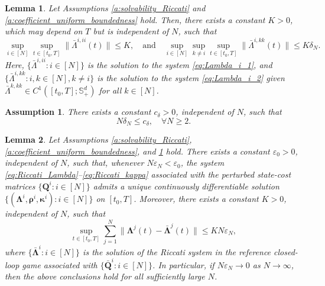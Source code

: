 \documentclass[10pt,a4paper]{amsart}
\newtheorem{assumption}{Assumption}
\newtheorem{lemma}{Lemma}
\begin{document}
\begin{lemma}
\label{l:estimate_bar_Lambda}
Let Assumptions \ref{a:solvability_Riccati} and \ref{a:coefficient_uniform_boundedness} hold. Then, there exists a constant $K > 0$, which may depend on $T$ but is independent of $N$, such that
$$\sup_{i \in [N]} \sup_{t \in [t_0, T]} \|\bar{\Lambda}^{i,ii}(t)\| \leq K, \quad \text{and} \quad \sup_{i \in [N]} \sup_{k \neq i} \sup_{t \in [t_0, T]} \|\bar{\Lambda}^{i,kk}(t)\| \leq K \delta_N.$$
Here, $\{\bar{\Lambda}^{i,ii}: i\in [N]\}$ is the solution to the system \eqref{eq:Lambda_i_1}, and $\{\bar{\Lambda}^{i,kk}: i, k \in [N], k \neq i\}$ is the solution to the system \eqref{eq:Lambda_i_2} given $\bar{\Lambda}^{k,kk} \in C^1([t_0,T]; \mathbb{S}^d_{+})$ for all $k \in [N]$.

\end{lemma}

\begin{assumption}
\label{a:delta_N_bound}
There exists a constant $c_{\delta} > 0$, independent of $N$, such that
$$N \delta_N \leq c_{\delta}, \quad \forall N \geq 2.$$
\end{assumption}

\begin{lemma}
\label{l:solvability_Riccati_Lambda_general}
Let Assumptions
\ref{a:solvability_Riccati},
\ref{a:coefficient_uniform_boundedness}, and
\ref{a:delta_N_bound} hold. There exists a constant $\varepsilon_0 > 0$, independent of $N$, such that, whenever $N \varepsilon_N < \varepsilon_0$, the system \eqref{eq:Riccati_Lambda}--\eqref{eq:Riccati_kappa} associated with the perturbed state-cost matrices $\{\bm{Q}^i:i\in[N]\}$ admits a unique continuously differentiable solution $\{(\bm{\Lambda}^i, \bm{\rho}^i, \bm{\kappa}^i): i \in [N]\}$ on $[t_0, T]$. Moreover, there exists a constant $K > 0$, independent of $N$, such that
$$\sup_{t \in [t_0, T]} \sum_{j=1}^N \|\bm{\Lambda}^j(t) - \bar{\bm{\Lambda}}^j(t)\| \leq KN \varepsilon_N,$$
where $\{\bar{\bm\Lambda}^i:i\in[N]\}$ is the solution of the Riccati system in the reference closed-loop game associated
with $\{\bar{\bm Q}^i:i\in[N]\}$. In particular, if $N \varepsilon_N \to 0$ as $N \to \infty$, then the above conclusions hold for all sufficiently large $N$.
\end{lemma}
\end{document}
